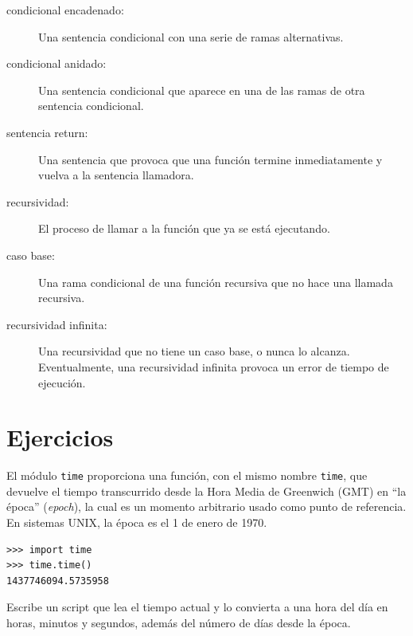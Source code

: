 \documentclass[10pt]{book}
\begin{document}
\begin{description}
\item[condicional encadenado:]  Una sentencia condicional con una serie
de ramas alternativas.

\item[condicional anidado:]  Una sentencia condicional que aparece
en una de las ramas de otra sentencia condicional.

\item[sentencia return:] Una sentencia que provoca que una función
termine inmediatamente y vuelva a la sentencia llamadora.

\item[recursividad:]  El proceso de llamar a la función que ya se está
ejecutando.

\item[caso base:]  Una rama condicional de una
función recursiva que no hace una llamada recursiva.

\item[recursividad infinita:]  Una recursividad que no tiene un
caso base, o nunca lo alcanza.  Eventualmente, una recursividad infinita
provoca un error de tiempo de ejecución.

\end{description}

\section{Ejercicios}

\begin{exercise}

El módulo {\tt time} proporciona una función, con el mismo nombre {\tt time}, que
devuelve el tiempo transcurrido desde la Hora Media de Greenwich (GMT) en ``la época'' ({\em epoch}), la cual es
un momento arbitrario usado como punto de referencia.  En sistemas UNIX, la
época es el 1 de enero de 1970.

\begin{verbatim}
>>> import time
>>> time.time()
1437746094.5735958
\end{verbatim}

Escribe un script que lea el tiempo actual y lo convierta a
una hora del día en horas, minutos y segundos, además del número de
días desde la época.

\end{exercise}
\end{document}
